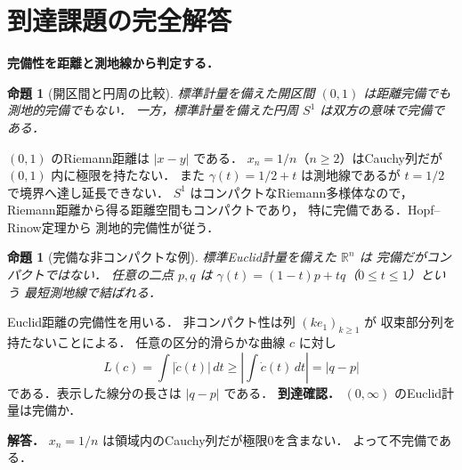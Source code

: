 \documentclass[a5paper,10pt,onecolumn]{jsarticle}
\makeatletter
\theoremstyle{mathnotetheorem}
\newtheorem{proposition}[theorem]{命題}
\renewcommand{\proofname}{証明}
\renewenvironment{proof}[1][\proofname]{%
  \par\pushQED{\qed}\normalfont\topsep4\p@\@plus2\p@\relax
  \trivlist\item[\hskip\labelsep\bfseries #1]\ignorespaces
}{\popQED\endtrivlist\@endpefalse}
\makeatother
\begin{document}
\section{到達課題の完全解答}
\noindent\textbf{完備性を距離と測地線から判定する．}
\begin{proposition}[開区間と円周の比較]
標準計量を備えた開区間 $(0,1)$ は距離完備でも
測地的完備でもない．
一方，標準計量を備えた円周 $S^1$ は双方の意味で完備である．
\end{proposition}
\begin{proof}
$(0,1)$ のRiemann距離は $|x-y|$ である．
$x_n=1/n$（$n\ge2$）はCauchy列だが
$(0,1)$ 内に極限を持たない．
また $\gamma(t)=1/2+t$ は測地線であるが
$t=1/2$ で境界へ達し延長できない．
$S^1$ はコンパクトなRiemann多様体なので，
Riemann距離から得る距離空間もコンパクトであり，
特に完備である．Hopf--Rinow定理から
測地的完備性が従う．
\end{proof}
\begin{proposition}[完備な非コンパクトな例]
標準Euclid計量を備えた $\mathbb R^n$ は
完備だがコンパクトではない．
任意の二点 $p,q$ は
$\gamma(t)=(1-t)p+tq$（$0\le t\le1$）という
最短測地線で結ばれる．
\end{proposition}
\begin{proof}
Euclid距離の完備性を用いる．
非コンパクト性は列 $(ke_1)_{k\ge1}$ が
収束部分列を持たないことによる．
任意の区分的滑らかな曲線 $c$ に対し
\[
L(c)=\int|\dot c(t)|\,dt
\ge\left|\int\dot c(t)\,dt\right|=|q-p|
\]
である．表示した線分の長さは $|q-p|$ である．
\end{proof}
\noindent\textbf{到達確認．}
$(0,\infty)$ のEuclid計量は完備か．
\par\noindent\textbf{解答．}
$x_n=1/n$ は領域内のCauchy列だが極限0を含まない．
よって不完備である．
\end{document}
